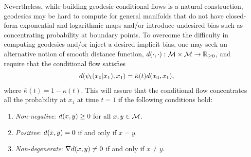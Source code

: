\documentclass{fairmeta}
\numberwithin{equation}{section}
\begin{document}
Nevertheless, while building geodesic conditional flows is a natural construction, geodesics may be hard to compute for general manifolds that do not have closed-form exponential and logarithmic maps {and/or introduce undesired bias such as concentrating probability at boundary points.} 
To overcome the difficulty in computing geodesics and/or inject a desired implicit bias, one may seek an alternative notion of smooth distance function, $d(\cdot,\cdot):{\mathcal{M}}\times{\mathcal{M}}\rightarrow\mathbb R_{\geq 0}$, and require that the conditional flow satisfies
\begin{equation}\label{e:dist_cond_flow}
    d(\psi_t(x_0|x_1),x_1) = \bar{\kappa}(t)d(x_0,x_1),
\end{equation}
where $\bar{\kappa}(t)=1-\kappa(t)$. This will assure that the conditional flow concentrates all the probability at $x_1$ at time $t=1$ if the following conditions hold:
\begin{enumerate}
    \item \emph{Non-negative}: $d(x,y)\geq 0$ for all $x,y\in {\mathcal{M}}$.
    \item \emph{Positive}: $d(x,y)=0$ if and only if $x=y$.
    \item \emph{Non-degenerate}: $\nabla d(x,y)\neq 0$ if and only if $x\neq y$.
\end{enumerate}
\end{document}
